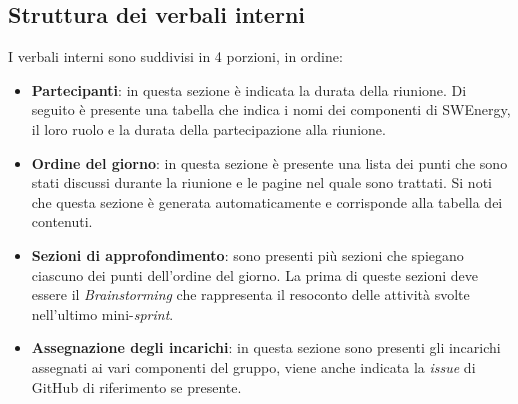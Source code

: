 \subsection{Struttura dei verbali interni}

I verbali interni sono suddivisi in 4 porzioni, in ordine:
\begin{itemize}
	\item \textbf{Partecipanti}: in questa sezione è indicata la durata della
	      riunione. Di seguito è presente una tabella che indica i nomi dei
	      componenti di SWEnergy, il loro ruolo e la durata della partecipazione
	      alla riunione.

	\item \textbf{Ordine del giorno}: in questa sezione è presente una lista
	      dei punti che sono stati discussi durante la riunione e le pagine nel
	      quale sono trattati. Si noti che questa sezione è generata
	      automaticamente e corrisponde alla tabella dei contenuti.

	\item \textbf{Sezioni di approfondimento}: sono presenti più sezioni che
	      spiegano ciascuno dei punti dell'ordine del giorno. La prima di queste
	      sezioni deve essere il \textit{Brainstorming} che rappresenta il
	      resoconto delle attività svolte nell'ultimo mini-\textit{sprint}.

	\item \textbf{Assegnazione degli incarichi}: in questa sezione sono
	      presenti gli incarichi assegnati ai vari componenti del gruppo, viene
	      anche indicata la \textit{issue} di GitHub di riferimento se presente.
\end{itemize}


